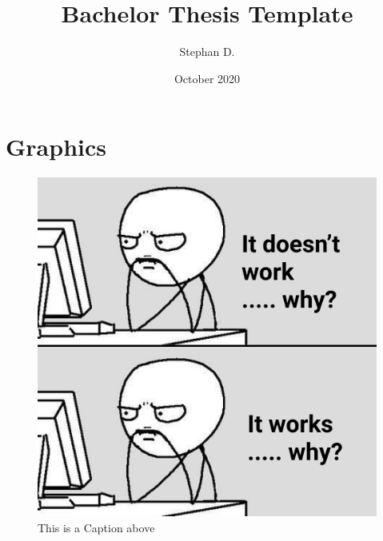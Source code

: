 \documentclass[12pt]{article}
\title{Bachelor Thesis Template}
\author{Stephan D.}
\date{October 2020}
\begin{document}
\clearpage\maketitle
\thispagestyle{empty}

\pagebreak
\tableofcontents

\pagebreak
\section{Graphics}


\begin{figure}[H]
  \caption{This is a Caption above \label{figure:cap-above}}
  \includegraphics[width=\textwidth]{img}
\end{figure}
\end{document}

